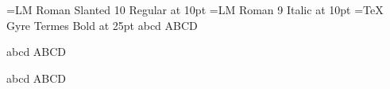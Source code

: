 

\font\testa={LM Roman Slanted 10 Regular} at 10pt
\font\testb={LM Roman 9 Italic}           at 10pt
\font\testc={TeX Gyre Termes Bold}        at 25pt
\testa abcd ABCD\par
\testb abcd ABCD\par
\testc abcd ABCD\par
\bye
